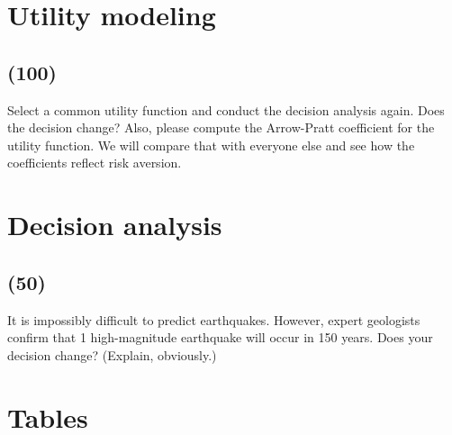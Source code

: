 \documentclass[11pt,a4paper]{article}
\makeatletter
\renewcommand\listoftables{%
    \@starttoc{lot}%
}
\makeatother
\begin{document}
\newpage


\section{Utility modeling}
\subsection*{(100)}
Select a common utility function and conduct the decision analysis again. Does the decision change? Also, please compute the Arrow-Pratt coefficient for the utility function. We will compare that with everyone else and see how the coefficients reflect risk aversion.





\newpage


\section{Decision analysis}
\subsection*{(50)}
It is impossibly difficult to predict earthquakes. However, expert geologists confirm that 1 high-magnitude earthquake will occur in 150 years. Does your decision change? (Explain, obviously.)





\newpage


\section*{Tables}

{%
\let\oldnumberline\numberline%
\renewcommand{\numberline}{\tablename~\oldnumberline}%
\listoftables%
}

\newpage


\end{document}
